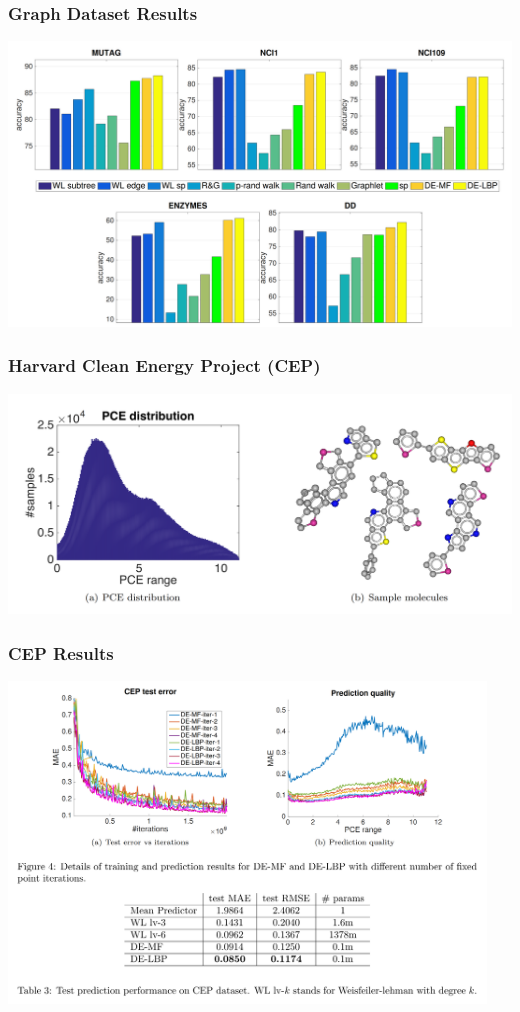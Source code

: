 \documentclass{beamer}
\begin{document}
    \begin{frame}
        \frametitle{Graph Dataset Results}
        \begin{center}
            \includegraphics[width=\textwidth]{graph_results.png}
        \end{center}
    \end{frame}

    \begin{frame}
        \frametitle{Harvard Clean Energy Project (CEP)}
        \begin{center}
            \includegraphics[width=\textwidth]{cep_data.png}
        \end{center}
    \end{frame}

    \begin{frame}
        \frametitle{CEP Results}
        \begin{center}
            \includegraphics[width=0.95\textwidth]{cep_results.png}
        \end{center}
    \end{frame}
\end{document}
